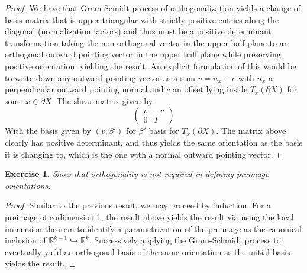 \documentclass{article}
\newtheorem{exercise}{Exercise}
\begin{document}
\begin{proof}
  We have that Gram-Scmidt process of orthogonalization yields a change of basis matrix that is upper triangular with strictly positive entries along the diagonal (normalization factors) and thus must be a positive determinant transformation taking the non-orthogonal vector in the upper half plane to an orthogonal outward pointing vector in the upper half plane while preserving positive orientation, yielding the result.
  An explicit formulation of this would be to write down any outward pointing vector as a sum $v = n_{x} + c$ with $n_{x}$ a perpendicular outward pointing normal and $c$ an offset lying inside $T_{x}(\partial X)$ for some $x \in \partial X$. The shear matrix given by
  \[
    \begin{pmatrix}
      v & -c \\
      0 & I
    \end{pmatrix}
  \]
  With the basis given by $(v, \beta')$ for $\beta '$ basis for $T_{x}(\partial X)$. The matrix above clearly has positive determinant, and thus yields the same orientation as the basis it is changing to, which is the one with a normal outward pointing vector. 
\end{proof}

\begin{exercise}
Show that orthogonality is not required in defining preimage orientations.   
\end{exercise}

\begin{proof}
  Similar to the previous result, we may proceed by induction. For a preimage of codimension 1, the result above yields the result via using the local immersion theorem to identify a parametrization of the preimage as the canonical inclusion of $\mathbb{R}^{k-1} \hookrightarrow \mathbb{R}^{k}$. Successively applying the Gram-Schmidt process to eventually yield an orthogonal basis of the same orientation as the initial basis yields the result. 
\end{proof}
\end{document}
